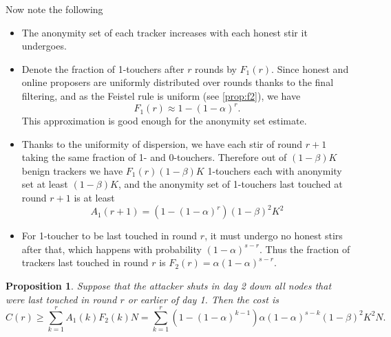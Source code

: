 \documentclass{article}
\newtheorem{proposition}{Proposition}
\begin{document}
Now note the following
\begin{itemize}
    \item The anonymity set of each tracker increases with each honest stir it undergoes. 
    \item Denote the fraction of 1-touchers after $r$ rounds by $F_1(r)$. Since honest and online proposers are uniformly distributed over rounds thanks to the final filtering, and as the Feistel rule is uniform (see \cref{prop:f2}), we have
    $$
    F_1(r)\approx 1-(1-\alpha)^r.
    $$
    This approximation is good enough for the anonymity set estimate.
    \item Thanks to the uniformity of dispersion, we have each stir of round $r+1$ taking the same fraction of 1- and 0-touchers. Therefore out of $(1-\beta)K$ benign trackers we have $F_1(r)(1-\beta)K$ 1-touchers each with anonymity set at least $(1-\beta)K$, and the anonymity set of 1-touchers last touched at round $r+1$ is at least
    $$
    A_1(r+1) = (1-(1-\alpha)^r)(1-\beta)^2K^2 
    $$
    \item For 1-toucher to be last touched in round $r$, it must undergo no honest stirs after that, which happens with probability $(1-\alpha)^{s-r}$. Thus the fraction of trackers last touched in round $r$ is
    $F_2(r)=\alpha(1-\alpha)^{s-r}$.
\end{itemize}


\begin{proposition}
Suppose that the attacker shuts in day 2 down all nodes that were last touched in round $r$ or earlier of day 1. Then the cost is
\begin{equation}
   C(r)\geq \sum_{k=1}^r A_1(k)F_2(k)N =\sum_{k=1}^r (1-(1-\alpha)^{k-1})\alpha(1-\alpha)^{s-k}(1-\beta)^2K^2N.
\end{equation}

\end{proposition}
\end{document}
